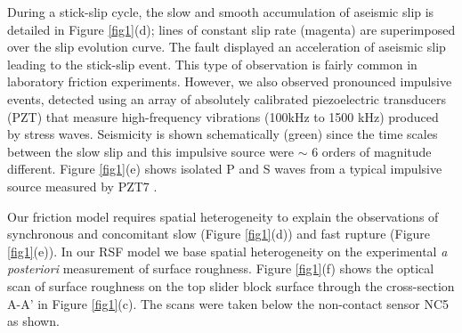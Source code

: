 \documentclass[preprint,1p, 10pt,authoryear]{elsarticle}
\begin{document}
During a stick-slip cycle, the slow and smooth accumulation of aseismic slip is detailed in Figure \ref{fig1}(d); lines of constant slip rate (magenta) are superimposed over the slip evolution curve.  The fault displayed an acceleration of aseismic slip leading to the stick-slip event. This type of observation is fairly common in laboratory friction experiments. However, we also observed pronounced impulsive events, detected using an array of absolutely calibrated piezoelectric transducers (PZT) that measure high-frequency vibrations (100kHz to 1500 kHz) produced by stress waves. Seismicity is shown schematically (green) since the time scales between the slow slip and this impulsive source were $\sim$ 6 orders of magnitude different.  Figure \ref{fig1}(e) shows isolated P and S waves from a typical impulsive source measured by PZT7  \citep{Selvadurai2019}.
 
Our friction model requires spatial heterogeneity to explain the observations of synchronous and concomitant slow (Figure \ref{fig1}(d)) and fast rupture (Figure \ref{fig1}(e)). In our RSF model we base spatial heterogeneity  on the experimental \textit{a posteriori} measurement of surface roughness. Figure \ref{fig1}(f) shows the optical scan of surface roughness on the top slider block surface through the cross-section A-A' in Figure \ref{fig1}(c).  The scans were taken below the non-contact sensor NC5 as shown.
\end{document}
